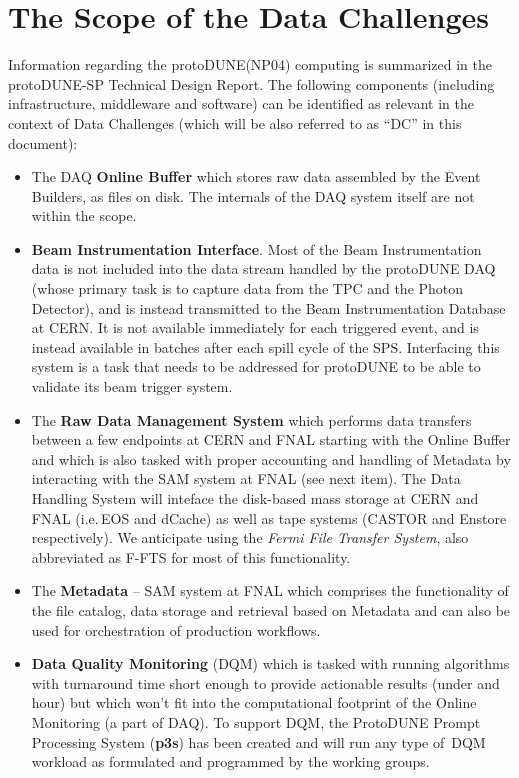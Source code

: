 \documentclass[pdftex,12pt,letter]{article}
\newcommand{\pd}{protoDUNE\xspace}
\begin{document}
\section{The Scope of the Data Challenges}
Information regarding the \pd (NP04) computing is summarized in the \pd-SP Technical Design Report\cite{docdb1794}.
The following components (including infrastructure, middleware and software) can be identified as relevant in the context
of Data Challenges (which will be also referred to as ``DC'' in this document):
\begin{itemize}
\item The DAQ \textbf{Online Buffer} which stores raw data assembled by the Event Builders, as files on disk. The internals
of the DAQ system itself are not within the scope.

\item  \textbf{Beam Instrumentation Interface}. Most of the Beam Instrumentation data is not included into the data stream
handled by the \pd DAQ (whose primary task is to capture data from the TPC and the Photon Detector), and is instead
transmitted to the Beam Instrumentation Database at CERN. It is not available immediately for each triggered event,
and is instead available in batches after each spill cycle of the SPS. Interfacing this system is a task that needs
to be addressed for \pd to be able to validate its beam trigger system.

\item The \textbf{Raw Data Management System}\cite{docdb1212}  which performs data transfers between a few endpoints
at CERN and FNAL starting with the Online Buffer and which is also tasked with proper accounting and handling of Metadata
by interacting with the SAM system at FNAL (see next item). The Data Handling System will inteface the disk-based mass storage
at CERN and FNAL (i.e.\,EOS\cite{eos} and dCache) as well as tape systems (CASTOR and Enstore respectively).
We anticipate using the \textit{Fermi File Transfer System}, also abbreviated as F-FTS\cite{fts} for most of this functionality.

\item The \textbf{Metadata}  -- SAM system at FNAL which comprises the functionality of the file catalog, data storage and
retrieval based on Metadata and can also be used for orchestration of production workflows.

\item \textbf{Data Quality Monitoring} (DQM) which is tasked with running algorithms with turnaround time short enough to provide
actionable results (under and hour) but which won't fit into the computational footprint of the Online Monitoring (a part of DAQ).
To support DQM, the ProtoDUNE Prompt Processing System (\textbf{p3s}) \cite{docdb1811,p3s} has been created and will run any type of\
DQM workload as formulated and programmed by the working groups.


\end{itemize}
\end{document}
